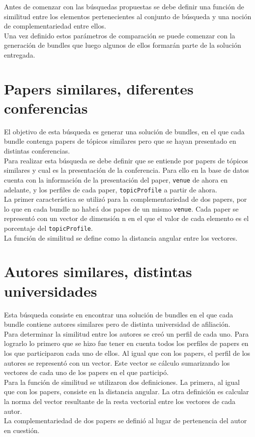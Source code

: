 Antes de comenzar con las búsquedas propuestas se debe definir una función de similitud entre los 
elementos pertenecientes al conjunto de búsqueda y una noción de complementariedad entre ellos.\\
Una vez definido estos parámetros de comparación se puede comenzar con la generación de bundles que 
luego algunos de ellos formarán parte de la solución entregada.
\section{Papers similares, diferentes conferencias}\label{bus:papSimDisLug}
El objetivo de esta búsqueda es generar una solución de bundles, en el que cada bundle contenga 
papers de tópicos similares pero que se hayan presentado en distintas conferencias.\\
Para realizar esta búsqueda se debe definir que se entiende por papers de tópicos similares y cual 
es la presentación de la conferencia. Para ello en la base de datos \cite{dataDrive} cuenta 
con la información de la presentación del paper, \texttt{venue} de ahora en adelante, y los 
perfiles de cada paper, \texttt{topicProfile} a partir de ahora.\\
La primer característica se utilizó para la complementariedad de dos papers, por lo que en cada 
bundle no habrá dos papes de un mismo \texttt{venue}. Cada paper se representó
con un vector de dimensión n en el que el valor de cada elemento es el porcentaje del \texttt{topicProfile}.\\ 
La función de similitud se define como la distancia angular entre los vectores.
\section{Autores similares, distintas universidades}
Esta búsqueda consiste en encontrar una solución de bundles en el que cada bundle contiene autores 
similares pero de distinta universidad de afiliación.\\
Para determinar la similitud entre los autores se creó un perfil de cada uno. Para lograrlo lo 
primero que se hizo fue tener en cuenta todos los perfiles de papers en los que participaron cada 
uno de ellos. Al igual que con los papers, el perfil de los autores se representó con un vector. 
Este vector se cálculo sumarizando los vectores de cada uno de los papers en el que participó.\\
Para la función de similitud se utilizaron dos definiciones. La primera, al igual que con los papers,
consiste en la distancia angular. La otra definición es calcular la norma del vector resultante de la resta
vectorial entre los vectores de cada autor.\\
La complementariedad de dos papers se definió al lugar de pertenencia del autor en cuestión.
